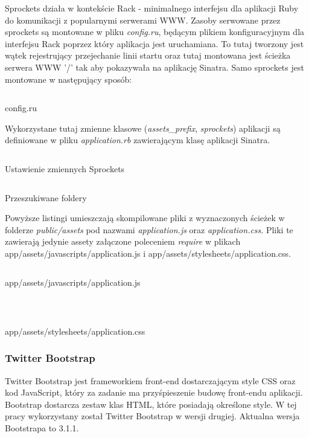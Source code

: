 \documentclass[11pt,a4paper, twoside]{article}
\begin{document}
Sprockets działa w kontekście Rack - minimalnego interfejsu dla aplikacji Ruby do komunikacji z popularnymi serwerami WWW. Zasoby serwowane przez sprockets są montowane w pliku \emph{config.ru}, będącym plikiem konfiguracyjnym dla interfejsu Rack poprzez który aplikacja jest uruchamiana. To tutaj tworzony jest wątek rejestrujący przejechanie linii startu oraz tutaj montowana jest ścieżka serwera WWW '/' tak aby pokazywała na aplikację Sinatra. 
\noindent
Samo sprockets jest montowane w następujący sposób:
\begin{listing}[H]
\inputminted[linenos=true]{ruby}{./src/sprockets_mount.rb}
\caption{config.ru}
\end{listing}
\noindent
Wykorzystane tutaj zmienne klasowe (\emph{assets\_prefix}, \emph{sprockets}) aplikacji są definiowane w pliku \emph{application.rb} zawierającym klasę aplikacji Sinatra.
\begin{listing}[H]
\inputminted[linenos=true]{ruby}{./src/sprockets_config.rb}
\caption{Ustawienie zmiennych Sprockets}
\end{listing}
\noindent
\begin{listing}[H]
\inputminted[linenos=true]{ruby}{./src/sprockets_asset_paths.rb}
\caption{Przeszukiwane foldery}
\end{listing}
\noindent
Powyższe listingi umieszczają skompilowane pliki z wyznaczonych ścieżek w folderze \emph{public/assets} pod nazwami \emph{application.js} oraz \emph{application.css}. Pliki te zawierają jedynie assety załączone poleceniem \emph{require} w plikach app/assets/javascripts/application.js i \newline app/assets/stylesheets/application.css.
\begin{listing}[H]
\inputminted[linenos=true]{javascript}{./src/application.js}
\caption{app/assets/javascripts/application.js}
$\label{aplication-js}$
\end{listing}
\begin{listing}[H]
\inputminted[linenos=true]{javascript}{./src/application.css}
\caption{app/assets/stylesheets/application.css}
\end{listing}
\subsubsection{Twitter Bootstrap}
Twitter Bootstrap jest frameworkiem front-end dostarczającym style CSS oraz kod JavaScript, który za zadanie ma przyśpieszenie budowę front-endu aplikacji. Bootstrap dostarcza zestaw klas HTML, które posiadają określone style. W tej pracy wykorzystany został Twitter Bootstrap w wersji drugiej. Aktualna wersja Bootstrapa to 3.1.1.
\end{document}
